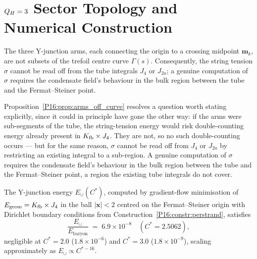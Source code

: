 

\section*{$Q_H=3$ Sector Topology and Numerical Construction}
\label{sec:topology_qh3}

\begin{proposition}
\label{P16:prop:arms_off_curve}
The three Y-junction arms, each connecting the origin to a crossing
midpoint $\mathbf{m}_k$, are not subsets of the trefoil centre curve
$\Gamma(s)$. Consequently, the string tension $\sigma$ cannot be read
off from the tube integrals $J_4$ or $J_{2a}$; a genuine computation
of $\sigma$ requires the condensate field's behaviour in the bulk region
between the tube and the Fermat--Steiner point.
\end{proposition}

\begin{remark}
\label{P16:rem:no_doublecounting}
Proposition~\ref{P16:prop:arms_off_curve} resolves a question worth
stating explicitly, since it could in principle have gone the other
way: if the arms were sub-segments of the tube, the string-tension
energy would risk double-counting energy already present in
$K_{\mathrm{fb}}\times J_4$. They are not, so no such double-counting occurs ---
but for the same reason, $\sigma$ cannot be read off from $J_4$ or
$J_{2a}$ by restricting an existing integral to a sub-region. A
genuine computation of $\sigma$ requires the condensate field's
behaviour in the bulk region between the tube and the Fermat--Steiner
point, a region the existing tube integrals do not cover.
\end{remark}

\begin{proposition}
\label{P16:prop:ejunc_zero}
The Y-junction energy $E_\cup(C^*)$, computed by gradient-flow
minimisation of $E_{\mathrm{geom}}=K_{\mathrm{fb}}\times J_4$ in the ball
$|\mathbf{x}|<2$ centred on the Fermat--Steiner origin with Dirichlet
boundary conditions from Construction~\ref{P16:constr:perstrand}, satisfies
\begin{equation}
  \frac{E_\cup}{E_{\mathrm{baryon}}}
  \;=\; 6.9\times10^{-8}
  \quad(C^*=2.5062),
\end{equation}
negligible at $C^*=2.0$ ($1.8\times10^{-6}$) and $C^*=3.0$
($1.8\times10^{-9}$), scaling approximately as $E_\cup\propto C^{*-16}$.
\end{proposition}

